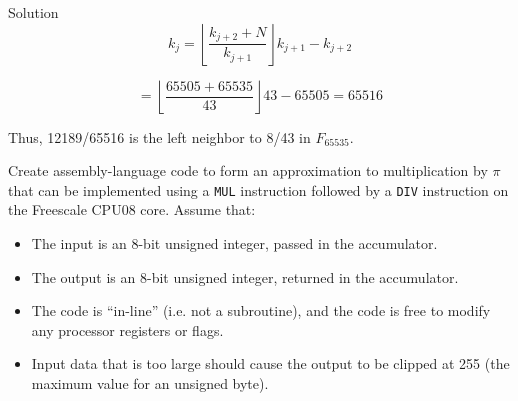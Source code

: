 \begin{vworkexampleparsection}{Solution}
\begin{equation}
\label{eq:ex:crla1:slcr0:scfr0:11:55}
k_j  = \left\lfloor {\frac{{k_{j + 2}  + N}}{{k_{j + 1} }}} 
\right\rfloor k_{j + 1}  - k_{j + 2}
\end{equation}

\begin{equation}
\label{eq:ex:crla1:slcr0:scfr0:11:56}
= \left\lfloor {\frac{{65505  + 65535}}{{43 }}} 
\right\rfloor 43  - 65505 = 65516
\end{equation}

Thus, 12189/65516 is the left neighbor to 8/43 in $F_{65535}$.
\end{vworkexampleparsection}

\begin{vworkexamplestatement}
\label{ex:crla1:slcr0:scfr0:12}
Create assembly-language code to form an approximation 
to multiplication by $\pi$ that 
can be implemented using a \texttt{MUL} instruction followed by
a \texttt{DIV} instruction on the Freescale CPU08 core.  Assume that:
\begin{itemize}
\item The input is an 8-bit unsigned integer, passed in the accumulator.
\item The output is an 8-bit unsigned integer, returned in the accumulator.
\item The code is ``in-line'' (i.e. not a subroutine), and the code is free to modify
      any processor registers or flags.
\item Input data that is too large should cause the output to be clipped at 255 (the
      maximum value for an unsigned byte).
\end{itemize}
\end{vworkexamplestatement}
